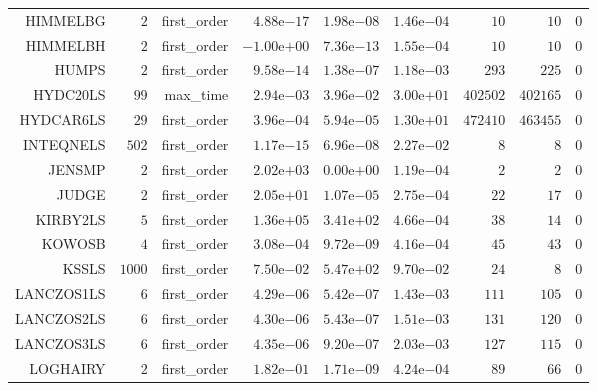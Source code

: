 \begin{longtable}{rrrrrrrrr}
HIMMELBG & \(     2\) & first\_order & \( 4.88\)e\(-17\) & \( 1.98\)e\(-08\) & \( 1.46\)e\(-04\) & \(    10\) & \(    10\) & \(     0\) \\
HIMMELBH & \(     2\) & first\_order & \(-1.00\)e\(+00\) & \( 7.36\)e\(-13\) & \( 1.55\)e\(-04\) & \(    10\) & \(    10\) & \(     0\) \\
HUMPS & \(     2\) & first\_order & \( 9.58\)e\(-14\) & \( 1.38\)e\(-07\) & \( 1.18\)e\(-03\) & \(   293\) & \(   225\) & \(     0\) \\
HYDC20LS & \(    99\) & max\_time & \( 2.94\)e\(-03\) & \( 3.96\)e\(-02\) & \( 3.00\)e\(+01\) & \(402502\) & \(402165\) & \(     0\) \\
HYDCAR6LS & \(    29\) & first\_order & \( 3.96\)e\(-04\) & \( 5.94\)e\(-05\) & \( 1.30\)e\(+01\) & \(472410\) & \(463455\) & \(     0\) \\
INTEQNELS & \(   502\) & first\_order & \( 1.17\)e\(-15\) & \( 6.96\)e\(-08\) & \( 2.27\)e\(-02\) & \(     8\) & \(     8\) & \(     0\) \\
JENSMP & \(     2\) & first\_order & \( 2.02\)e\(+03\) & \( 0.00\)e\(+00\) & \( 1.19\)e\(-04\) & \(     2\) & \(     2\) & \(     0\) \\
JUDGE & \(     2\) & first\_order & \( 2.05\)e\(+01\) & \( 1.07\)e\(-05\) & \( 2.75\)e\(-04\) & \(    22\) & \(    17\) & \(     0\) \\
KIRBY2LS & \(     5\) & first\_order & \( 1.36\)e\(+05\) & \( 3.41\)e\(+02\) & \( 4.66\)e\(-04\) & \(    38\) & \(    14\) & \(     0\) \\
KOWOSB & \(     4\) & first\_order & \( 3.08\)e\(-04\) & \( 9.72\)e\(-09\) & \( 4.16\)e\(-04\) & \(    45\) & \(    43\) & \(     0\) \\
KSSLS & \(  1000\) & first\_order & \( 7.50\)e\(-02\) & \( 5.47\)e\(+02\) & \( 9.70\)e\(-02\) & \(    24\) & \(     8\) & \(     0\) \\
LANCZOS1LS & \(     6\) & first\_order & \( 4.29\)e\(-06\) & \( 5.42\)e\(-07\) & \( 1.43\)e\(-03\) & \(   111\) & \(   105\) & \(     0\) \\
LANCZOS2LS & \(     6\) & first\_order & \( 4.30\)e\(-06\) & \( 5.43\)e\(-07\) & \( 1.51\)e\(-03\) & \(   131\) & \(   120\) & \(     0\) \\
LANCZOS3LS & \(     6\) & first\_order & \( 4.35\)e\(-06\) & \( 9.20\)e\(-07\) & \( 2.03\)e\(-03\) & \(   127\) & \(   115\) & \(     0\) \\
LOGHAIRY & \(     2\) & first\_order & \( 1.82\)e\(-01\) & \( 1.71\)e\(-09\) & \( 4.24\)e\(-04\) & \(    89\) & \(    66\) & \(     0\) \\

\end{longtable}
